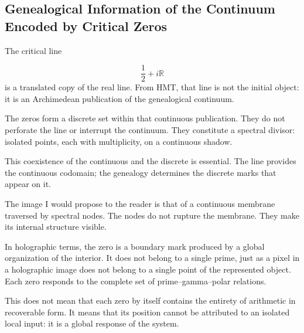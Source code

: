 \subsection{Genealogical Information of the Continuum Encoded by Critical Zeros}
The critical line\par
\[
\frac12+i\mathbb R
\]
is a translated copy of the real line. From HMT, that line is not the initial object: it is an Archimedean publication of the genealogical continuum.\par
The zeros form a discrete set within that continuous publication. They do not perforate the line or interrupt the continuum. They constitute a spectral divisor: isolated points, each with multiplicity, on a continuous shadow.\par
This coexistence of the continuous and the discrete is essential. The line provides the continuous codomain; the genealogy determines the discrete marks that appear on it.\par
The image I would propose to the reader is that of a continuous membrane traversed by spectral nodes. The nodes do not rupture the membrane. They make its internal structure visible.\par
In holographic terms, the zero is a boundary mark produced by a global organization of the interior. It does not belong to a single prime, just as a pixel in a holographic image does not belong to a single point of the represented object. Each zero responds to the complete set of prime–gamma–polar relations.\par
This does not mean that each zero by itself contains the entirety of arithmetic in recoverable form. It means that its position cannot be attributed to an isolated local input: it is a global response of the system.\par
{}
